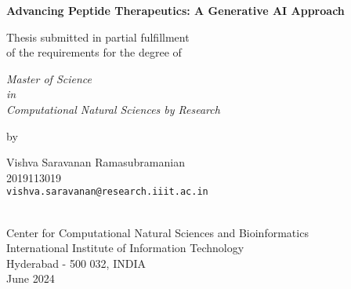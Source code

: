 \thispagestyle{empty}
\begin{center}
\vspace*{1.5cm}
{\Large \bf Advancing Peptide Therapeutics: A Generative AI Approach}

\vspace*{3.75cm}
{\large Thesis submitted in partial fulfillment\\}
{\large  of the requirements for the degree of \\}

\vspace*{1cm}
{\it {\large Master of Science} \\
{\large in\\}
{\large Computational Natural Sciences by Research \\}}

\vspace*{1cm}
{\large by}

\vspace*{5mm}
{\large Vishva Saravanan Ramasubramanian\\}
{\large 2019113019\\
{\small \tt vishva.saravanan@research.iiit.ac.in}}

\vspace*{4.0cm}
{\\}
{\large Center for Computational Natural Sciences and Bioinformatics\\}
{\large International Institute of Information Technology\\}
{\large Hyderabad - 500 032, INDIA\\}
{\large June 2024\\}
\end{center}
